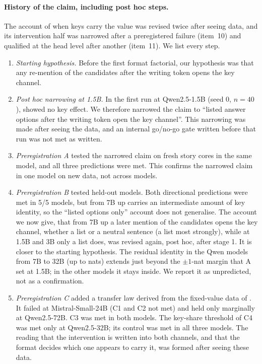 \paragraph{History of the claim, including post hoc steps.}
The account of when keys carry the value was revised twice after seeing data, and its intervention half was narrowed after a preregistered failure (item~10) and qualified at the head level after another (item~11). We list every step.
\begin{enumerate}\setlength\itemsep{1pt}
  \item \emph{Starting hypothesis.} Before the first format factorial, our hypothesis was that any re-mention of the candidates after the writing token opens the key channel.
  \item \emph{Post hoc narrowing at 1.5B.} In the first run at Qwen2.5-1.5B (seed 0, $n = 40$), \fmtPost{} showed no key effect. We therefore narrowed the claim to ``listed answer options after the writing token open the key channel''. This narrowing was made after seeing the data, and an internal go/no-go gate written before that run was not met as written.
  \item \emph{Preregistration A} tested the narrowed claim on fresh story cores in the same model, and all three predictions were met. This confirms the narrowed claim in one model on new data, not across models.
  \item \emph{Preregistration B} tested held-out models. Both directional predictions were met in 5/5 models, but from 7B up \fmtPost{} carries an intermediate amount of key identity, so the ``listed options only'' account does not generalise. The account we now give, that from 7B up a later mention of the candidates opens the key channel, whether a list or a neutral sentence (a list most strongly), while at 1.5B and 3B only a list does, was revised again, post hoc, after stage 1. It is closer to the starting hypothesis. The residual \fmtNone{} identity in the Qwen models from 7B to 32B (up to \noneMax{} nats) extends just beyond the $\pm 1$-nat margin that A set at 1.5B; in the other models it stays inside. We report it as unpredicted, not as a confirmation.
  \item \emph{Preregistration C} added a transfer law derived from the fixed-value data of \citet{anonymous2026fitted}. It failed at Mistral-Small-24B (C1 and C2 not met) and held only marginally at Qwen2.5-72B. C3 was met in both models. The key-share threshold of C4 was met only at Qwen2.5-32B; its \fmtBefore{} control was met in all three models. The reading that the intervention is written into both channels, and that the format decides which one appears to carry it, was formed after seeing these data.

\end{enumerate}
